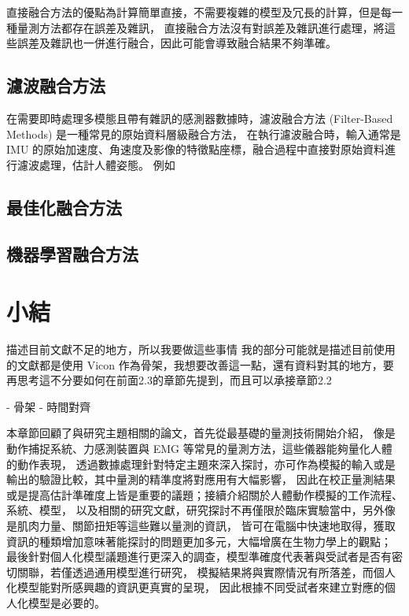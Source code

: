 直接融合方法的優點為計算簡單直接，不需要複雜的模型及冗長的計算，但是每一種量測方法都存在誤差及雜訊，
直接融合方法沒有對誤差及雜訊進行處理，將這些誤差及雜訊也一併進行融合，因此可能會導致融合結果不夠準確。

\subsection*{濾波融合方法}
在需要即時處理多模態且帶有雜訊的感測器數據時，濾波融合方法 (Filter-Based Methods) 是一種常見的原始資料層級融合方法，
在執行濾波融合時，輸入通常是 IMU 的原始加速度、角速度及影像的特徵點座標，融合過程中直接對原始資料進行濾波處理，估計人體姿態。
例如


\subsection*{最佳化融合方法}

\subsection*{機器學習融合方法}

\section{小結}
描述目前文獻不足的地方，所以我要做這些事情
我的部分可能就是描述目前使用的文獻都是使用 Vicon 作為骨架，我想要改善這一點，還有資料對其的地方，要再思考這不分要如何在前面2.3的章節先提到，而且可以承接章節2.2

- 骨架
- 時間對齊

本章節回顧了與研究主題相關的論文，首先從最基礎的量測技術開始介紹，
像是動作捕捉系統、力感測裝置與 EMG 等常見的量測方法，這些儀器能夠量化人體的動作表現，
透過數據處理針對特定主題來深入探討，亦可作為模擬的輸入或是輸出的驗證比較，其中量測的精準度將對應用有大幅影響，
因此在校正量測結果或是提高估計準確度上皆是重要的議題；接續介紹關於人體動作模擬的工作流程、系統、模型，
以及相關的研究文獻，研究探討不再僅限於臨床實驗當中，另外像是肌肉力量、關節扭矩等這些難以量測的資訊，
皆可在電腦中快速地取得，獲取資訊的種類增加意味著能探討的問題更加多元，大幅增廣在生物力學上的觀點；
最後針對個人化模型議題進行更深入的調查，模型準確度代表著與受試者是否有密切關聯，若僅透過通用模型進行研究，
模擬結果將與實際情況有所落差，而個人化模型能對所感興趣的資訊更真實的呈現，
因此根據不同受試者來建立對應的個人化模型是必要的。


